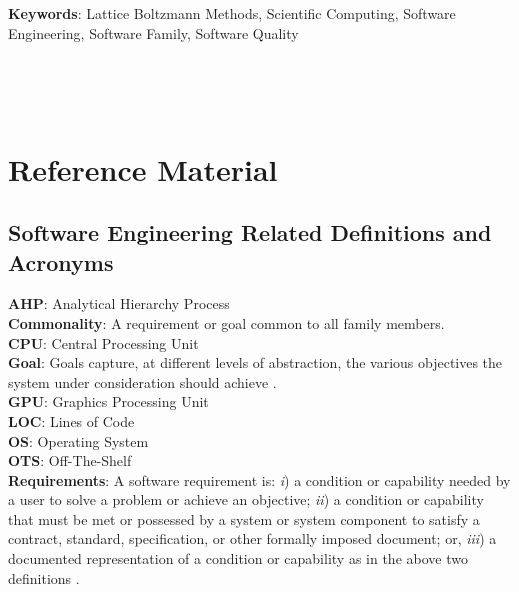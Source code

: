 \documentclass[12pt, notitlepage]{article}
\begin{document}
\begin{singlespace}
\noindent\textbf{Keywords}: Lattice Boltzmann Methods, Scientific Computing, Software Engineering, Software Family, Software Quality 


\newpage
{}
\tableofcontents
{}

~\newpage

\listoffigures

\listoftables

~\newpage

\clearpage
\section*{Reference Material}

\subsection*{Software Engineering Related Definitions and Acronyms}

\noindent\textbf{AHP}: Analytical Hierarchy Process\\

\noindent\textbf{Commonality}: A requirement or goal common to all family members.\\

\noindent\textbf{CPU}: Central Processing Unit\\

\noindent\textbf{Goal}: Goals capture, at different levels of abstraction, the various objectives the system under consideration should achieve \citep{van2001goal}.\\

\noindent\textbf{GPU}: Graphics Processing Unit\\

\noindent\textbf{LOC}: Lines of Code\\

\noindent\textbf{OS}: Operating System\\

\noindent\textbf{OTS}: Off-The-Shelf\\

\noindent\textbf{Requirements}: A software requirement is: \textit{i}) a condition or capability needed by a user to solve a problem or achieve an objective; \textit{ii}) a condition or capability that must be met or possessed by a system or system component to satisfy a contract, standard, specification, or other formally imposed document; or, \textit{iii}) a documented representation of a condition or capability as in the above two definitions \citep{thayer2000ieee}.\\


\end{singlespace}
\end{document}
